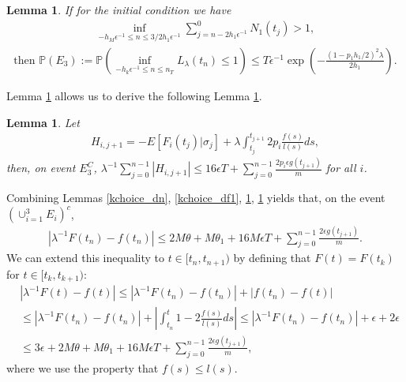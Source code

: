 \documentclass[12pt]{article}
\def\P{\mathbb{P}}
\numberwithin{equation}{section}  %
\newtheorem{lem}[thm]{Lemma}
\begin{document}
\begin{lem}\label{kchoice_E3}%
If for the initial condition we have
\begin{align}
\inf_{-h_M\epsilon^{-1}\leq n\leq 3/2h_1\epsilon^{-1}}\sum_{j=n-2h_1\epsilon^{-1}}^{0} N_1(t_j)>1 \label{kchoice_ini_eq2},
\end{align}
\begin{align*} 
\text{then }\P(E_3):=\P\left(\inf_{-h_k\epsilon^{-1}\leq n\leq n_T}L_{\lambda}(t_n)\leq 1\right)\leq T\epsilon^{-1} \exp\left(-\frac{(1-p_1h_1/2)^2\lambda}{2h_1}\right).
\end{align*} 
\end{lem}
Lemma \ref{kchoice_E3} allows us to derive the following Lemma \ref{kchoice_df2}.

\begin{lem}\label{kchoice_df2}%
Let
\begin{align}
H_{i,j+1}=-E[F_i(t_j)|\sigma_j]+\lambda\int_{t_j}^{t_{j+1}} 2p_i\frac{f(s)}{l(s)}ds\label{def_H},
\end{align}
then, on event $E_3^C$, $\lambda^{-1}\sum_{j=0}^{n-1}|H_{i,j+1}|\leq 16\epsilon T+\sum_{j=0}^{n-1} \frac{2p_i\epsilon g(t_{j+1})}{m}$ for all $i$.
\end{lem}

Combining Lemmas \ref{kchoice_dn}, \ref{kchoice_df1}, \ref{kchoice_E3}, \ref{kchoice_df2} yields that, on the event $(\cup_{i=1}^3 E_i)^c$, 
\begin{align*} 
\left|\lambda^{-1}F(t_n)-f(t_n)\right|\leq 2M\theta+M\theta_1+16M\epsilon T+\sum_{j=0}^{n-1} \frac{2\epsilon g(t_{j+1})}{m}.
\end{align*} 
We can extend this inequality to $t\in[t_{n},t_{n+1})$ by defining that $F(t)=F(t_k)$ for $t\in[t_k,t_{k+1})$:
\begin{align} 
&\left|\lambda^{-1}F(t)-f(t)\right|\leq\left|\lambda^{-1}F(t_n)-f(t_n)\right|+\left|f(t_n)-f(t)\right|\nonumber\\
&\leq\left|\lambda^{-1}F(t_n)-f(t_n)\right|+\left|\int_{t_n}^{t}1-2\frac{f(s)}{l(s)}ds\right|\leq\left|\lambda^{-1}F(t_n)-f(t_n)\right|+\epsilon+2\epsilon\nonumber\\
&\leq3\epsilon+2M\theta+M\theta_1+16M\epsilon T+\sum_{j=0}^{n-1} \frac{2\epsilon g(t_{j+1})}{m}\label{k_ef},
\end{align} 
where we use the property that $f(s)\leq l(s)$.
\end{document}
